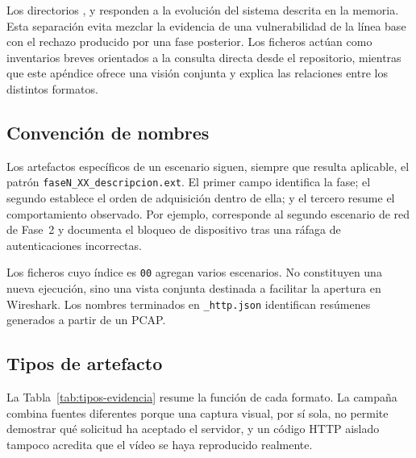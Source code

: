 Los directorios ,  y  responden a la evolución del sistema descrita en la memoria. Esta separación evita mezclar la evidencia de una vulnerabilidad de la línea base con el rechazo producido por una fase posterior. Los ficheros  actúan como inventarios breves orientados a la consulta directa desde el repositorio, mientras que este apéndice ofrece una visión conjunta y explica las relaciones entre los distintos formatos.

\subsection{Convención de nombres}

Los artefactos específicos de un escenario siguen, siempre que resulta aplicable, el patrón \texttt{faseN\_XX\_descripcion.ext}. El primer campo identifica la fase; el segundo establece el orden de adquisición dentro de ella; y el tercero resume el comportamiento observado. Por ejemplo,  corresponde al segundo escenario de red de Fase~2 y documenta el bloqueo de dispositivo tras una ráfaga de autenticaciones incorrectas.

Los ficheros cuyo índice es \texttt{00} agregan varios escenarios. No constituyen una nueva ejecución, sino una vista conjunta destinada a facilitar la apertura en Wireshark. Los nombres terminados en \texttt{\_http.json} identifican resúmenes generados a partir de un PCAP.

\subsection{Tipos de artefacto}

La Tabla~\ref{tab:tipos-evidencia} resume la función de cada formato. La campaña combina fuentes diferentes porque una captura visual, por sí sola, no permite demostrar qué solicitud ha aceptado el servidor, y un código HTTP aislado tampoco acredita que el vídeo se haya reproducido realmente.

